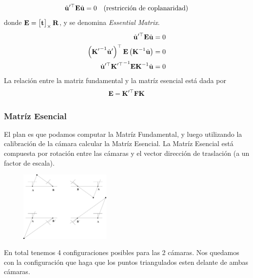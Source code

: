 \begin{frame}
    \begin{equation*}
        \hat{\boldsymbol{\mathbf{u}}}^{\prime\top} \boldsymbol{\mathbf{E}} \hat{\boldsymbol{\mathbf{u}}}  = 0 \quad \text{(restricción de coplanaridad)}
    \end{equation*}
    donde $\boldsymbol{\mathbf{E}} = \begin{bmatrix}
        \boldsymbol{\mathbf{t}} 
    \end{bmatrix}_{\times} \boldsymbol{\mathbf{R}}$, y se denomina \emph{Essential Matrix}.
%
    \begin{align*}
        \hat{\boldsymbol{\mathbf{u}}}^{\prime\top} \boldsymbol{\mathbf{E}} \hat{\boldsymbol{\mathbf{u}}}  &= 0\\
        \left( {\boldsymbol{\mathbf{K}}^{\prime}}^{-1} \dot{\boldsymbol{\mathbf{u}}}^{\prime} \right)^{\top} \boldsymbol{\mathbf{E}} \left( {\boldsymbol{\mathbf{K}}}^{-1} \dot{\boldsymbol{\mathbf{u}}} \right) &= 0\\
        \dot{\boldsymbol{\mathbf{u}}}^{\prime\top} {\boldsymbol{\mathbf{K}}^{\prime\top}}^{-1} \boldsymbol{\mathbf{E}} {\boldsymbol{\mathbf{K}}}^{-1} \dot{\boldsymbol{\mathbf{u}}}&= 0
    \end{align*}
    La relación entre la matriz fundamental y la matríz esencial está dada por
    \begin{equation*}
        \boldsymbol{\mathbf{E}} = \boldsymbol{\mathbf{K}}^{\prime\top} \boldsymbol{\mathbf{F}} \boldsymbol{\mathbf{K}}
    \end{equation*}

    
\end{frame}

\begin{frame}
    \frametitle{Matríz Esencial}


    El plan es que podamos computar la Matríz Fundamental, y luego utilizando la calibración de la cámara calcular la Matríz Esencial. La Matríz Esencial está compuesta por rotación entre las cámaras y el vector dirección de traslación (a un factor de escala).
    
    \begin{figure}
        \includegraphics[width=0.4\textwidth]{./images/essential_matrix_possible_solutions.pdf}
    \end{figure}

    En total tenemos 4 configuraciones posibles para las 2 cámaras. Nos quedamos con la configuración que haga que los puntos triangulados esten delante de ambas cámaras.
\end{frame}


